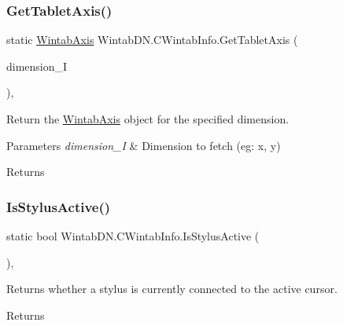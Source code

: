 \subsubsection{\texorpdfstring{Get\+Tablet\+Axis()}{GetTabletAxis()}}
{\footnotesize\ttfamily static \mbox{\hyperlink{struct_wintab_d_n_1_1_wintab_axis}{Wintab\+Axis}} Wintab\+D\+N.\+C\+Wintab\+Info.\+Get\+Tablet\+Axis (\begin{DoxyParamCaption}\item[{\mbox{\hyperlink{namespace_wintab_d_n_a38705aa38c49c04846399172fa9fd1cd}{E\+Axis\+Dimension}}}]{dimension\+\_\+I }\end{DoxyParamCaption})\hspace{0.3cm}{\ttfamily [inline]}, {\ttfamily [static]}}



Return the \mbox{\hyperlink{struct_wintab_d_n_1_1_wintab_axis}{Wintab\+Axis}} object for the specified dimension. 


\begin{DoxyParams}{Parameters}
{\em dimension\+\_\+I} & Dimension to fetch (eg\+: x, y)\\
\hline
\end{DoxyParams}
\begin{DoxyReturn}{Returns}

\end{DoxyReturn}
\mbox{\label{class_wintab_d_n_1_1_c_wintab_info_ad7f57161542bff690ae05fe4e0eef36f}} 
\subsubsection{\texorpdfstring{Is\+Stylus\+Active()}{IsStylusActive()}}
{\footnotesize\ttfamily static bool Wintab\+D\+N.\+C\+Wintab\+Info.\+Is\+Stylus\+Active (\begin{DoxyParamCaption}{ }\end{DoxyParamCaption})\hspace{0.3cm}{\ttfamily [inline]}, {\ttfamily [static]}}



Returns whether a stylus is currently connected to the active cursor. 

\begin{DoxyReturn}{Returns}

\end{DoxyReturn}
\mbox{\label{class_wintab_d_n_1_1_c_wintab_info_ade0433e0979734111164bcb759bcc229}} 
